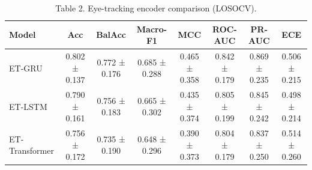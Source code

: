 \begin{table}[t]
\centering
\caption{Table 2. Eye-tracking encoder comparison (LOSOCV).}
\label{tab:table2_et_encoders}
\begin{tabular}{lccccccc}
\hline
Model & Acc & BalAcc & Macro-F1 & MCC & ROC-AUC & PR-AUC & ECE \\
\hline
ET-GRU & 0.802 ± 0.137 & 0.772 ± 0.176 & 0.685 ± 0.288 & 0.465 ± 0.358 & 0.842 ± 0.179 & 0.869 ± 0.235 & 0.506 ± 0.215 \\
ET-LSTM & 0.790 ± 0.161 & 0.756 ± 0.183 & 0.665 ± 0.302 & 0.435 ± 0.374 & 0.805 ± 0.199 & 0.845 ± 0.242 & 0.498 ± 0.214 \\
ET-Transformer & 0.756 ± 0.172 & 0.735 ± 0.190 & 0.648 ± 0.296 & 0.390 ± 0.373 & 0.804 ± 0.179 & 0.837 ± 0.250 & 0.514 ± 0.260 \\
\hline
\end{tabular}
\end{table}
